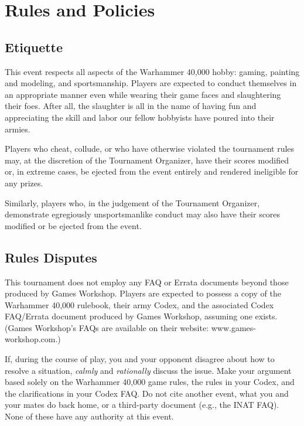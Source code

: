 \documentclass[12pt,titlepage]{article}
\begin{document}
\newpage

\section*{Rules and Policies}

\subsection*{Etiquette}

This event respects all aspects of the Warhammer 40,000 hobby: gaming, painting and modeling, and sportsmanship. Players are expected to conduct themselves in an appropriate manner even while wearing their game faces and slaughtering their foes. After all, the slaughter is all in the name of having fun and appreciating the skill and labor our fellow hobbyists have poured into their armies.

Players who cheat, collude, or who have otherwise violated the tournament rules may, at the discretion of the Tournament Organizer, have their scores modified or, in extreme cases, be ejected from the event entirely and rendered ineligible for any prizes.

Similarly, players who, in the judgement of the Tournament Organizer, demonstrate egregiously unsportsmanlike conduct may also have their scores modified or be ejected from the event.

\subsection*{Rules Disputes}

This tournament does not employ any FAQ or Errata documents beyond those produced by Games Workshop. Players are expected to possess a copy of the Warhammer 40,000 rulebook, their army Codex, and the associated Codex FAQ/Errata document produced by Games Workshop, assuming one exists. (Games Workshop's FAQs are available on their website: www.games-workshop.com.)

If, during the course of play, you and your opponent disagree about how to resolve a situation, \textit{calmly} and \textit{rationally} discuss the issue. Make your argument based solely on the Warhammer 40,000 game rules, the rules in your Codex, and the clarifications in your Codex FAQ. Do not cite another event, what you and your mates do back home, or a third-party document (e.g., the INAT FAQ). None of these have any authority at this event.
\end{document}
